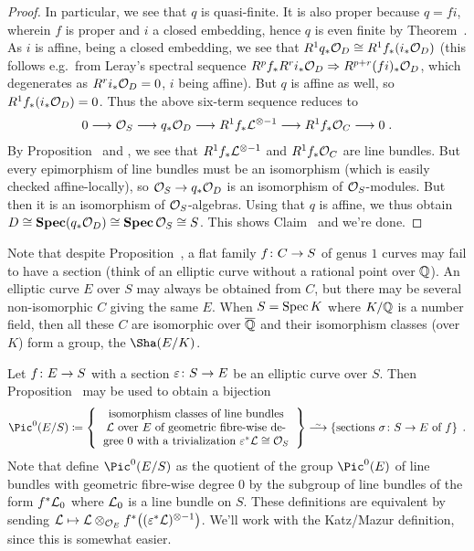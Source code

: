 \documentclass[a4paper,parskip=half,numbers=enddot, DIV=12]{scrreprt}
\begin{document}
\begin{proof}
	In particular, we see that $q$ is quasi-finite. It is also proper because $q=fi$, wherein $f$ is proper and $i$ a closed embedding, hence $q$ is even finite by Theorem~. As $i$ is affine, being a closed embedding, we see that $R^1q_*\mathcal{O}_D\cong R^1f_*(i_*\mathcal{O}_D)$ (this follows e.g.\ from Leray's spectral sequence $R^pf_*R^ri_*\Oo_D\converge R^{p+r}(fi)_*\Oo_D$, which degenerates as $R^ri_*\mathcal{O}_D=0$, $i$ being affine). But $q$ is affine as well, so $R^1f_*(i_*\mathcal{O}_D)=0$. Thus the above six-term sequence reduces to 
	\begin{align}
		0\morphism \Oo_S\morphism q_*\Oo_D\morphism R^1f_*\Ll^{\otimes -1}\morphism R^1f_*\Oo_C\morphism 0\;.
	\end{align}
	By Proposition~ and , we see that $R^1f_*\mathcal{L}^{\otimes -1}$ and $R^1f_*\mathcal{O}_C$ are line bundles. But every epimorphism of line bundles must be an isomorphism (which is easily checked affine-locally), so $\Oo_S\morphism q_*\Oo_D$ is an isomorphism of $\mathcal{O}_S$-modules. But then it is an isomorphism of $\mathcal{O}_S$-algebras. Using that $q$ is affine, we thus obtain $D\cong \operatorname{\mathbf{Spec}} (q_*\mathcal{O}_D)\cong \operatorname{\mathbf{Spec}}\mathcal{O}_S\cong S$. This shows Claim~ and we're done.
\end{proof}
\begin{rem}
	Note that despite Proposition~, a flat family $f\colon C\morphism S$ of genus $1$ curves may fail to have a section (think of an elliptic curve without a rational point over $\mathbb{Q}$). An elliptic curve $E$ over $S$ may always be obtained from $C$, but there may be several non-isomorphic $C$ giving the same $E$. When $S=\operatorname{Spec} K$ where $K/\mathbb{Q}$ is a number field, then all these $C$ are isomorphic over $\overline{\mathbb{Q}}$ and their isomorphism classes (over $K$) form a group, the  $\Sha(E/K)$.
\end{rem}
	Let $f\colon E\morphism S$ with a section $\epsilon\colon S\morphism E$ be an elliptic curve over $S$. Then Proposition~ may be used to obtain a bijection
	\begin{align*}
		\Pic^0(E/S)\coloneqq\left\{\begin{tabular}{c}
			isomorphism classes of line bundles\\
			$\Ll$ over $E$ of geometric fibre-wise de-\\
			gree 0 with a trivialization $\epsilon^*\Ll\cong\Oo_S$
		\end{tabular}\right\}\isomorphism\left\{\text{sections }\sigma\colon S\to E\text{ of }f\right\}\;.
	\end{align*}
	Note that \cite[pp.~63--67]{katzmazur} define $\Pic^0(E/S)$ as the quotient of the group $\Pic^0(E)$ of line bundles with geometric fibre-wise degree $0$ by the subgroup of line bundles of the form $f^*\mathcal{L}_0$ where $\mathcal{L}_0$ is a line bundle on $S$. These definitions are equivalent by sending $\mathcal{L}\mapsto \mathcal{L}\otimes_{\mathcal{O}_E}f^*\big((\varepsilon^*\mathcal{L})^{\otimes -1}\big)$. We'll work with the Katz/Mazur definition, since this is somewhat easier.
	
\end{document}
